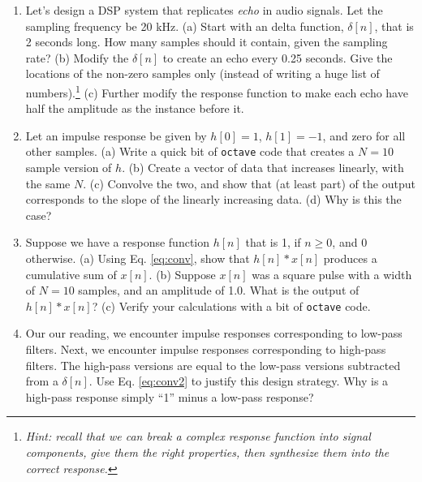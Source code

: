 \documentclass{article}
\begin{document}
\begin{enumerate}
\item Let's design a DSP system that replicates \textit{echo} in audio signals.  Let the sampling frequency be 20 kHz.  (a) Start with an delta function, $\delta[n]$, that is 2 seconds long.  How many samples should it contain, given the sampling rate? (b) Modify the $\delta[n]$ to create an echo every 0.25 seconds. Give the locations of the non-zero samples only (instead of writing a huge list of numbers).\footnote{\textit{Hint: recall that we can break a complex response function into signal components, give them the right properties, then synthesize them into the correct response.}} (c) Further modify the response function to make each echo have half the amplitude as the instance before it. \\ \vspace{5cm}
\item Let an impulse response be given by $h[0] = 1$, $h[1] = -1$, and zero for all other samples. (a) Write a quick bit of \verb+octave+ code that creates a $N = 10$ sample version of $h$.  (b) Create a vector of data that increases linearly, with the same $N$.  (c) Convolve the two, and show that (at least part) of the output corresponds to the slope of the linearly increasing data.  (d) Why is this the case? \\ \vspace{5cm}
\item Suppose we have a response function $h[n]$ that is 1, if $n\geq 0$, and 0 otherwise.  (a) Using Eq. \ref{eq:conv}, show that $h[n] * x[n]$ produces a cumulative sum of $x[n]$.  (b) Suppose $x[n]$ was a square pulse with a width of $N = 10$ samples, and an amplitude of 1.0.  What is the output of $h[n] * x[n]$? (c) Verify your calculations with a bit of \verb+octave+ code.  \\ \vspace{4cm}
\item Our our reading, we encounter impulse responses corresponding to low-pass filters.  Next, we encounter impulse responses corresponding to high-pass filters.  The high-pass versions are equal to the low-pass versions subtracted from a $\delta [n]$.  Use Eq. \ref{eq:conv2} to justify this design strategy.  Why is a high-pass response simply ``1'' minus a low-pass response?
\end{enumerate}
\end{document}
